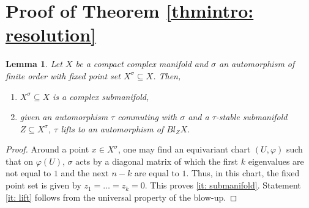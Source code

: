 \documentclass[12pt,reqno]{amsart}
\newtheorem{lem}[thm]{Lemma}
\theoremstyle{definition}
\begin{document}
\section{Proof of Theorem \ref{thmintro: resolution}}

\begin{lem}
    Let $X$ be a compact complex manifold and $\sigma$ an automorphism of finite order with fixed point set $X^\sigma\subseteq X$. Then,
    \begin{enumerate}
        \item\label{it: submanifold} $X^\sigma\subseteq X$ is a complex submanifold,
        \item\label{it: lift} given an automorphism $\tau$ commuting with $\sigma$ and a $\tau$-stable submanifold $Z\subseteq X^\sigma$, $\tau$ lifts to an automorphism of $Bl_{Z}X$.
    \end{enumerate}
\end{lem}
\begin{proof}
   Around a point $x\in X^\sigma$, one may find an equivariant chart $(U,\varphi)$ such that on $\varphi(U)$, $\sigma$ acts by a diagonal matrix of which the first $k$ eigenvalues are not equal to $1$ and the next $n-k$ are equal to $1$. Thus, in this chart, the fixed point set is given by $z_1=\dots=z_k=0$. This proves \ref{it: submanifold}. Statement \ref{it: lift} follows from the universal property of the blow-up.\end{proof}
\end{document}
